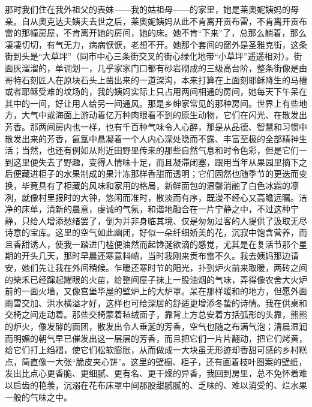\par 那时我们住在我外祖父的表妹——我的姑祖母——的家里，她是莱奥妮姨妈的母亲。自从奥克达夫姨夫去世之后，莱奥妮姨妈从此不肯离开贡布雷，不肯离开贡布雷的那幢房屋，不肯离开她的房间，她的床。她不肯“下来”了，总那么躺着，那么凄凄切切，有气无力，病病恹恹，老想不开。她那个套间的窗外是圣雅克街，这条街到头是“大草坪”（同市中心三条街交叉的街心绿化地带“小草坪”遥遥相对）。街面灰溜溜的，单调划一，几乎家家门口都有砂岩砌成的三级高台阶，整条街像是由哥特石刻匠人在原块石头上凿出来的一道深沟，本来打算在上面刻耶稣降生的马槽或者耶稣受难的坟场的，我的姨妈实际上只占用两间相通的房间，她每天下午呆在其中的一间，好让用人给另一间通风。那是乡绅家常见的那种房间。世界上有些地方，大气中或海面上游动着亿万种肉眼看不到的原生动物，它们在闪光、在散发出芳香。那两间房内也一样，也有千百种气味令人心醉，那是从品德、智慧和习惯中散发出来的芳香，氤氲中悬凝着一个人内心深处隐而不露、丰富至极的全部精神生活；当然，也还有例如从附近田野里传来的那些自然气息和时令色彩，但是它们一到这里便失去了野趣，变得人情味十足，而且凝滞闭塞，跟用当年从果园里摘下之后便藏进柜子的水果制成的果汁冻那样香甜而透明；它们固然也随季节的更迭而变换，毕竟具有了柜藏的风味和家用的格局，新鲜面包的温馨消融了白色冰霜的凛冽，就像村里报时的大钟，悠闲而准时，散淡而有序，既漫不经心又高瞻远瞩。洁净的床单，清新的晨意，虔诚的气氛，和谐地融合在一片宁静之中，不过这种宁静，只给人增添愁绪罢了，倒为并非身临其境、仅是匆匆过客的人提供了汲取无尽诗意的宝库。这里的空气如此幽闭，好似一朵纤细娇美的花，沉寂中饱含营养，而且香甜诱人，使我一踏进门槛便油然而起馋涎欲滴的感觉，尤其是在复活节那个星期的开头几天，那时早晨还寒意料峭，当时我刚来贡布雷不久。我去姨妈那边请安，她们先让我在外间稍候。乍暖还寒时节的阳光，扑到炉火前来取暖，两砖之间的柴禾已经蹿起耀眼的火苗，给整间屋子抹上一股油烟的气味，弄得像农舍大火炉前的一面火墙，又像宫堡华屋的壁炉上的大炉罩。呆在那样暖和的地方，但愿外面雨雪交加、洪水横溢才好，这样也可给深居的舒适更增添冬蛰的诗情。我在供桌和交椅之间走动着。那些交椅蒙着毡绒面子，靠背上方总安着方括弧形的头靠，熊熊的炉火，像发酵的面团，散发出令人垂涎的芳香，空气也随之布满气泡；清晨湿润而明媚的朝气早已催发出这一层层的芳香，而且把它们一片片翻动，把它们烤黄，给它们打上绉褶，使它们松软膨胀，从而做成一大块虽无形迹却香甜可感的乡村糕点，简直像一大张“脆皮夹心饼”。这里的壁橱、柜子，还有画着枝叶图案的壁纸，发出比点心更香脆、更细腻、更有名、更干燥的异香，我回到房里，总不免怀着难以启齿的艳羡，沉溺在花布床罩中间那股甜腻腻的、乏味的、难以消受的、烂水果一般的气味之中。
